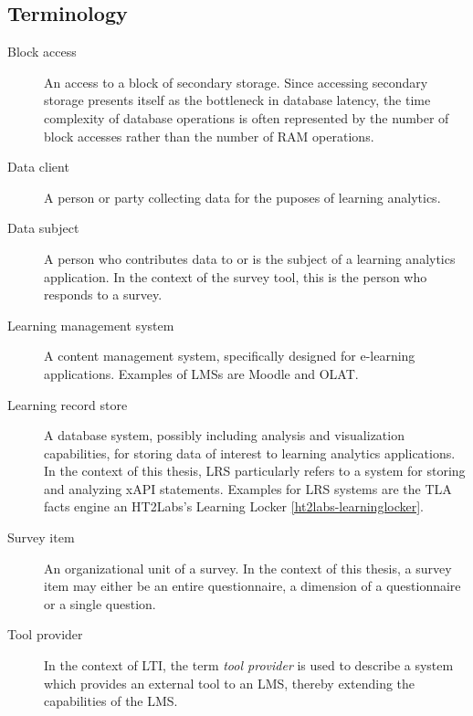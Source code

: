 \subsection{Terminology}
\begin{description}
	\item[Block access] 
		An access to a block of secondary storage. Since accessing secondary storage
		presents itself as the bottleneck in database latency, the time complexity of
		database operations is often represented by the number of block accesses rather
		than the number of RAM operations.
    \item[Data client]
    	A person or party collecting data for the puposes of learning analytics.
    \item[Data subject]
    	A person who contributes data to or is the subject of a learning analytics 
    	application. In the context of the survey tool, this is the person who
    	responds to a survey.
    \item[Learning management system]
	    A content management system, specifically designed for e-learning applications.
	    Examples of LMSs are Moodle and OLAT.
    \item[Learning record store]
    	A database system, possibly including analysis and visualization capabilities, 
	    for storing data of interest to learning analytics applications.
	    In the context of this thesis, LRS particularly refers to a system for storing and analyzing xAPI statements.
    	Examples for LRS systems are the TLA facts engine an HT2Labs's Learning Locker \ref{ht2labs-learninglocker}.
    \item[Survey item]
    	An organizational unit of a survey. In the context of this thesis,
    	a survey item may either be an entire questionnaire, a
    	dimension of a questionnaire or a single question. 
    \item[Tool provider]
	    In the context of LTI, the term \textit{tool provider} is used to describe a
	    system which provides an external tool to an LMS, thereby extending the capabilities of the LMS.
\end{description}